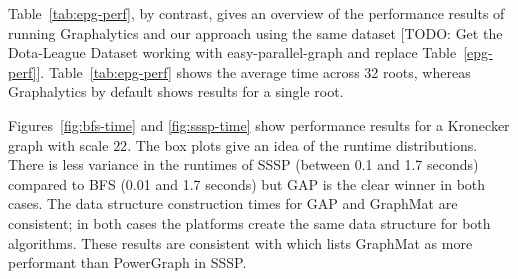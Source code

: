 \documentclass{llncs}
\begin{document}
Table~\ref{tab:epg-perf}, by contrast, gives an overview of the performance results of running Graphalytics and our approach using the same dataset [TODO: Get the Dota-League Dataset working with easy-parallel-graph and replace Table~\ref{epg-perf}]. Table~\ref{tab:epg-perf} shows the average time across 32 roots, whereas Graphalytics by default shows results for a single root.

Figures~\ref{fig:bfs-time} and \ref{fig:sssp-time} show performance results for a Kronecker graph with scale $22$. The box plots give an idea of the runtime distributions. There is less variance in the runtimes of SSSP (between 0.1 and 1.7 seconds) compared to BFS (0.01 and 1.7 seconds) but GAP is the clear winner in both cases. The data structure construction times for GAP and GraphMat are consistent; in both cases the platforms create the same data structure for both algorithms. These results are consistent with \cite{Sundaram:2015:GraphMat} which lists GraphMat as more performant than PowerGraph in SSSP.

\end{document}
